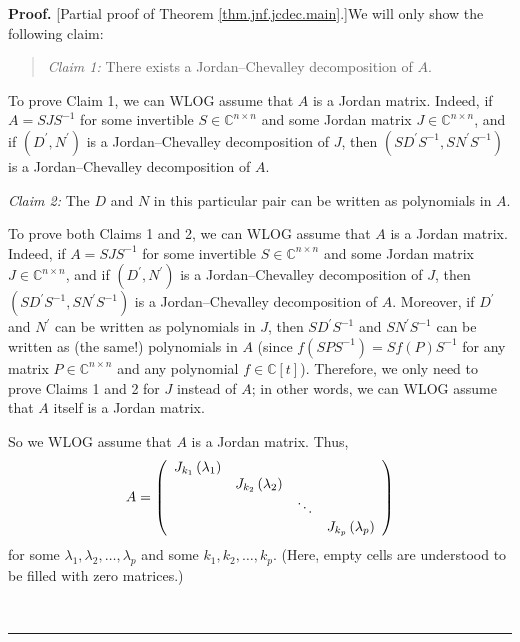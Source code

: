 \documentclass[numbers=enddot,12pt,final,onecolumn,notitlepage]{scrartcl}%
\numberwithin{exer}{subsection}
\theoremstyle{definition}
\newenvironment{statement}{\begin{quote}}{\end{quote}}
\newenvironment{proof}[1][Proof]{\noindent\textbf{#1.} }{\ \rule{0.5em}{0.5em}}
\newenvironment{noncompile}{}{}
\begin{document}
\begin{proof}
[Partial proof of Theorem \ref{thm.jnf.jcdec.main}.]We will only show the
following claim:

\begin{statement}
\textit{Claim 1:} There exists a Jordan--Chevalley decomposition of $A$.
\end{statement}

To prove Claim 1, we can WLOG assume that $A$ is a Jordan matrix. Indeed, if
$A=SJS^{-1}$ for some invertible $S\in\mathbb{C}^{n\times n}$ and some Jordan
matrix $J\in\mathbb{C}^{n\times n}$, and if $\left(  D^{\prime},N^{\prime
}\right)  $ is a Jordan--Chevalley decomposition of $J$, then $\left(
SD^{\prime}S^{-1},SN^{\prime}S^{-1}\right)  $ is a Jordan--Chevalley
decomposition of $A$.

\begin{noncompile}
\textit{Claim 2:} The $D$ and $N$ in this particular pair can be written as
polynomials in $A$.
\end{noncompile}

\begin{noncompile}
To prove both Claims 1 and 2, we can WLOG assume that $A$ is a Jordan matrix.
Indeed, if $A=SJS^{-1}$ for some invertible $S\in\mathbb{C}^{n\times n}$ and
some Jordan matrix $J\in\mathbb{C}^{n\times n}$, and if $\left(  D^{\prime
},N^{\prime}\right)  $ is a Jordan--Chevalley decomposition of $J$, then
$\left(  SD^{\prime}S^{-1},SN^{\prime}S^{-1}\right)  $ is a Jordan--Chevalley
decomposition of $A$. Moreover, if $D^{\prime}$ and $N^{\prime}$ can be
written as polynomials in $J$, then $SD^{\prime}S^{-1}$ and $SN^{\prime}%
S^{-1}$ can be written as (the same!) polynomials in $A$ (since $f\left(
SPS^{-1}\right)  =Sf\left(  P\right)  S^{-1}$ for any matrix $P\in
\mathbb{C}^{n\times n}$ and any polynomial $f\in\mathbb{C}\left[  t\right]
$). Therefore, we only need to prove Claims 1 and 2 for $J$ instead of $A$; in
other words, we can WLOG assume that $A$ itself is a Jordan matrix.
\end{noncompile}

So we WLOG assume that $A$ is a Jordan matrix. Thus,%
\[
A=\left(
\begin{array}
[c]{cccc}%
J_{k_{1}}\left(  \lambda_{1}\right)  &  &  & \\
& J_{k_{2}}\left(  \lambda_{2}\right)  &  & \\
&  & \ddots & \\
&  &  & J_{k_{p}}\left(  \lambda_{p}\right)
\end{array}
\right)
\]
for some $\lambda_{1},\lambda_{2},\ldots,\lambda_{p}$ and some $k_{1}%
,k_{2},\ldots,k_{p}$. (Here, empty cells are understood to be filled with zero matrices.)


\end{proof}
\end{document}
